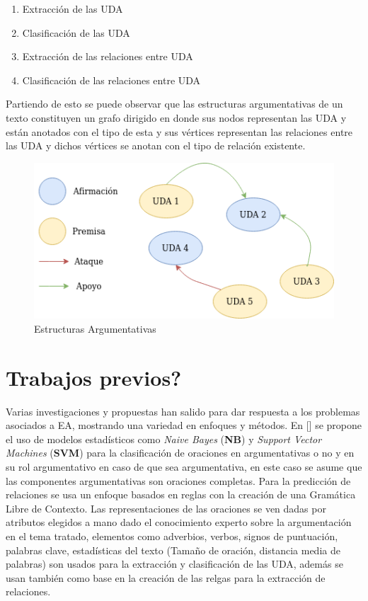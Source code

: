 \begin{enumerate}
    \item Extracción de las UDA
    \item Clasificación de las UDA
    \item Extracción de las relaciones entre UDA
    \item Clasificación de las relaciones entre UDA
\end{enumerate}

Partiendo de esto se puede observar que las estructuras argumentativas de un texto constituyen un grafo dirigido 
en donde sus nodos representan las UDA y están anotados con el tipo de esta y sus vértices representan las 
relaciones entre las UDA y dichos vértices se anotan con el tipo de relación existente.

\begin{figure}[h!]
	\begin{center}
		\begin{center}
			\includegraphics[scale=.3]{Graphics/Estructuras argumentativas.drawio.png}
        \end{center}
	    \caption{Estructuras Argumentativas}\label{fig:seg_uda}
	\end{center}
\end{figure}

\section{Trabajos previos?}

Varias investigaciones y propuestas han salido para dar respuesta a los problemas asociados a EA, mostrando
una variedad en enfoques y métodos.
En [\cite{palau2009argumentation}] se propone
el uso de modelos estadísticos como \emph{Naive Bayes} (\textbf{NB}) y \emph{Support Vector Machines} (\textbf{SVM}) 
para la clasificación de 
oraciones en argumentativas o no y en su rol argumentativo en caso de que sea argumentativa, en este
caso se asume que las componentes argumentativas son oraciones completas. Para la predicción de relaciones
se usa un enfoque basados en reglas con la creación de una Gramática Libre de Contexto. Las representaciones
de las oraciones se ven dadas por atributos elegidos a mano dado el conocimiento experto sobre la argumentación
en el tema tratado, elementos como adverbios, verbos, signos de puntuación, palabras clave, estadísticas del texto
(Tamaño de oración, distancia media de palabras) son usados para la extracción y clasificación de las UDA, además
se usan también como base en la creación de las relgas para la extracción de relaciones.

